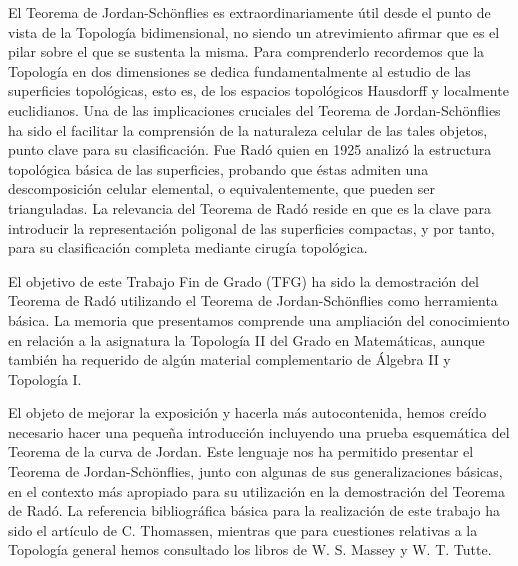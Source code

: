 El Teorema de Jordan-Schönflies es extraordinariamente útil desde el punto de vista de la Topología bidimensional, no siendo un atrevimiento  afirmar que es el pilar sobre el que se sustenta la misma. 
Para comprenderlo recordemos que la Topología en dos dimensiones se dedica fundamentalmente al estudio de las superficies topológicas, esto es, de los espacios topológicos  Hausdorff y localmente euclidianos.  Una de las implicaciones cruciales del Teorema de Jordan-Schönflies  ha sido el facilitar la comprensión de la naturaleza celular de las tales objetos, punto clave para su clasificación. Fue Radó quien en 1925  analizó la estructura topológica básica de las superficies, probando que  éstas admiten una descomposición celular elemental, o equivalentemente, que pueden ser  trianguladas. La relevancia del Teorema de Radó  reside en que  es la clave para introducir la representación poligonal de las superficies compactas, y por tanto, para  su clasificación completa mediante cirugía topológica.

El objetivo  de este Trabajo Fin de Grado (TFG) ha sido la demostración del Teorema de Radó   utilizando el Teorema de Jordan-Schönflies como herramienta básica. La memoria que presentamos comprende una ampliación del conocimiento en relación a la asignatura la Topología II del Grado en Matemáticas,   aunque también ha requerido  de algún material complementario de  Álgebra II y Topología I.  

El objeto de mejorar la exposición y hacerla más autocontenida, hemos creído necesario hacer una pequeña introducción incluyendo  una prueba esquemática   del Teorema de la curva de Jordan. Este lenguaje nos ha permitido  presentar el Teorema de Jordan-Schönflies, junto con algunas de sus generalizaciones básicas, en el contexto más apropiado para su utilización   en la demostración del Teorema de Radó. La referencia bibliográfica básica para la realización de este trabajo ha sido el artículo de C. Thomassen, \cite{Thomassen92}  mientras que para cuestiones relativas a la Topología general hemos consultado los libros de W. S. Massey \cite{Massey77} y W. T. Tutte. \cite{Tutte84}
\cleardoublepage





